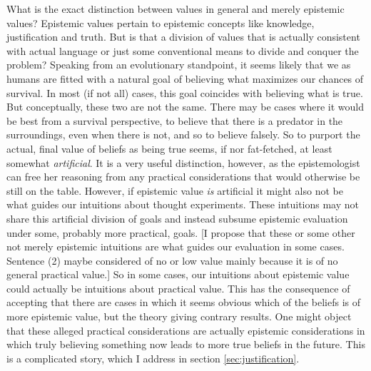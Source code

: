 \documentclass[12pt,numbers=noenddot]{scrartcl}
\begin{document}
What is the exact distinction between values in general and merely epistemic values? Epistemic values pertain to epistemic concepts like knowledge, justification and truth. But is that a division of values that is actually consistent with actual language or just some conventional means to divide and conquer the problem? Speaking from an evolutionary standpoint, it seems likely that we as humans are fitted with a natural goal of believing what maximizes our chances of survival. In most (if not all) cases, this goal coincides with believing what is true. But conceptually, these two are not the same. There may be cases where it would be best from a survival perspective, to believe that there is a predator in the surroundings, even when there is not, and so to believe falsely. So to purport the actual, final value of beliefs as being true seems, if nor fat-fetched, at least somewhat \emph{artificial}. It is a very useful distinction, however, as the epistemologist can free her reasoning from any practical considerations that would otherwise be still on the table. However, if epistemic value \emph{is} artificial it might also not be what guides our intuitions about thought experiments. These intuitions may not share this artificial division of goals and instead subsume epistemic evaluation under some, probably more practical, goals. [I propose that these or some other not merely epistemic intuitions are what guides our evaluation in some cases. Sentence (2) maybe considered of no or low value mainly because it is of no general practical value.] So in some cases, our intuitions about epistemic value could actually be intuitions about practical value. This has the consequence of accepting that there are cases in which it seems obvious which of the beliefs is of more epistemic value, but the theory giving contrary results. One might object that these alleged practical considerations are actually epistemic considerations in which truly believing something now leads to more true beliefs in the future. This is a complicated story, which I address in section \ref{sec:justification}.
\end{document}
